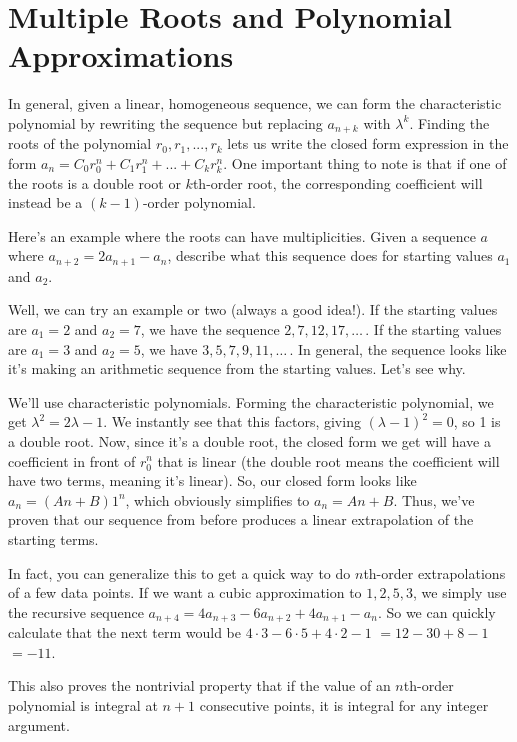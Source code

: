 \documentclass[12pt,letterpaper]{article}
\begin{document}
\section{Multiple Roots and Polynomial Approximations}
In general, given a linear, homogeneous sequence, we can form the
characteristic polynomial by rewriting the sequence but replacing
$a_{n+k}$ with $\lambda^k$. Finding the roots of the polynomial
$r_0, r_1, ..., r_k$ lets us write the closed form expression in the
form $a_n = C_0 r_0^n + C_1 r_1^n + ... + C_k r_k^n$. One important
thing to note is that if one of the roots is a double root or
$k$th-order root, the corresponding coefficient will instead be a $(k-1)$-order
polynomial.

Here's an example where the roots can have multiplicities. Given a
sequence $a$ where $a_{n+2} = 2a_{n+1} - a_n$, describe what
this sequence does for starting values $a_1$ and $a_2$.

Well, we can try an example or two (always a good idea!). If the starting
values are $a_1 = 2$ and $a_2 = 7$, we have the sequence $2, 7, 12, 17, \ldots\,$.
If the starting values are $a_1 = 3$ and $a_2 = 5$, we have $3, 5, 7, 9, 11, \ldots\,$.
In general, the sequence looks like it's making an arithmetic sequence from
the starting values. Let's see why.

We'll use characteristic polynomials. Forming the characteristic polynomial,
we get $\lambda^2 = 2\lambda - 1$. We instantly see that this factors, giving
$(\lambda - 1)^2 = 0$, so 1 is a double root. Now, since it's a double root,
the closed form we get will have a coefficient in front of $r_0^n$ that is
linear (the double root means the coefficient will have two terms, meaning it's linear).
So, our closed form looks like $a_n = (An + B)1^n$, which obviously simplifies to $a_n = An+B$.
Thus, we've proven that our sequence from before produces a linear extrapolation
of the starting terms.

In fact, you can generalize this to get a quick way to do $n$th-order extrapolations
of a few data points. If we want a cubic approximation to $1, 2, 5, 3$, we simply
use the recursive sequence $a_{n+4} = 4a_{n+3} - 6a_{n+2} + 4a_{n+1} - a_n$. So we
can quickly calculate that the next term would be $4 \cdot 3 - 6 \cdot 5 + 4 \cdot
2 - 1$ $= 12 - 30 + 8 - 1$ $=-11$.

This also proves the nontrivial property that if the value of an
$n$th-order polynomial is integral at $n+1$ consecutive points, it is integral
for any integer argument.
\end{document}
